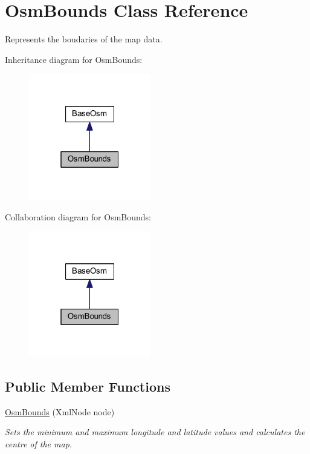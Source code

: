 \hypertarget{class_osm_bounds}{}\section{Osm\+Bounds Class Reference}
\label{class_osm_bounds}


Represents the boudaries of the map data.  




Inheritance diagram for Osm\+Bounds\+:\nopagebreak
\begin{figure}[H]
\begin{center}
\leavevmode
\includegraphics[width=151pt]{class_osm_bounds__inherit__graph}
\end{center}
\end{figure}


Collaboration diagram for Osm\+Bounds\+:\nopagebreak
\begin{figure}[H]
\begin{center}
\leavevmode
\includegraphics[width=151pt]{class_osm_bounds__coll__graph}
\end{center}
\end{figure}
\subsection*{Public Member Functions}
\begin{DoxyCompactItemize}
\item 
\mbox{\hyperlink{class_osm_bounds_a5440393c02b739012154b1473c2ffc4a}{Osm\+Bounds}} (Xml\+Node node)
\begin{DoxyCompactList}\small\item\em Sets the minimum and maximum longitude and latitude values and calculates the centre of the map. \end{DoxyCompactList}\end{DoxyCompactItemize}
